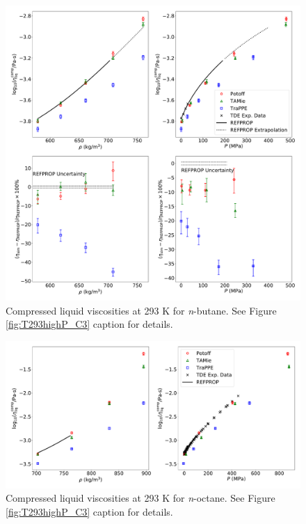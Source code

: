 \documentclass[preprint,review,12pt]{elsarticle}
\begin{document}
	\begin{figure}[htb!]
		\centering
		\includegraphics[width=6.4in]{compare_REFPROP_T293highP_C4H10.pdf}
		\caption{Compressed liquid viscosities at 293 K for \textit{n}-butane. See Figure \ref{fig:T293highP_C3} caption for details.}
		\label{fig:T293highP_C4}
	\end{figure} 
	
	\begin{figure}[htb!]
		\centering
		\includegraphics[width=6.4in]{compare_REFPROP_T293highP_C8H18.pdf}
		\caption{Compressed liquid viscosities at 293 K for \textit{n}-octane. See Figure \ref{fig:T293highP_C3} caption for details.}
		\label{fig:T293highP_C8}
	\end{figure} 
	
\end{document}
